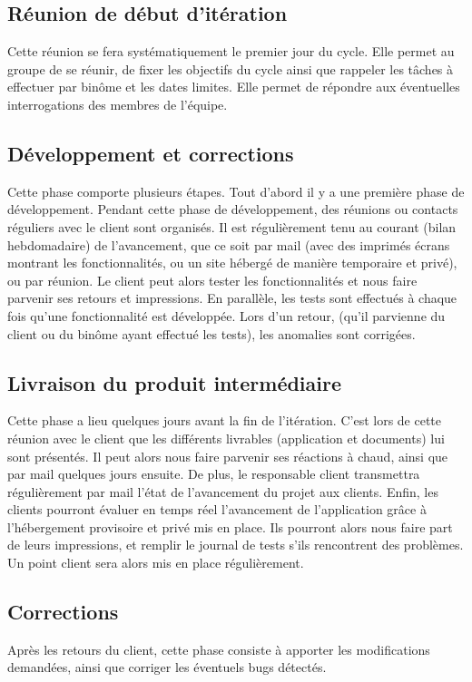 \documentclass{../res/univ-projet}
\begin{document}
  \subsection{Réunion de début d'itération}    
    Cette réunion se fera systématiquement le premier jour du cycle. Elle permet au groupe de se réunir, de fixer les objectifs du cycle ainsi que rappeler les tâches à effectuer par binôme et les dates limites. Elle permet de répondre aux éventuelles interrogations des membres de l’équipe.

  \subsection{Développement et corrections}
    Cette phase comporte plusieurs étapes. Tout d’abord il y a une première phase de développement. Pendant cette phase de développement, des réunions ou contacts réguliers avec le client sont organisés. Il est régulièrement tenu au courant (bilan hebdomadaire) de l’avancement, que ce soit par mail (avec des imprimés écrans montrant les fonctionnalités, ou un site hébergé de manière temporaire et privé), ou par réunion. Le client peut alors tester les fonctionnalités et nous faire parvenir ses retours et impressions. En parallèle, les tests sont effectués à chaque fois qu’une fonctionnalité est développée. Lors d’un retour, (qu’il parvienne du client ou du binôme ayant effectué les tests), les anomalies sont corrigées.
  \subsection{Livraison du produit intermédiaire}
    Cette phase a lieu quelques jours avant la fin de l’itération. C’est lors de cette réunion avec le client que les différents livrables (application et documents) lui sont présentés. Il peut alors nous faire parvenir ses réactions à chaud, ainsi que par mail quelques jours ensuite. De plus, le responsable client transmettra régulièrement par mail l’état de l’avancement du projet aux clients. Enfin, les clients pourront évaluer en temps réel l’avancement de l’application grâce à l’hébergement provisoire et privé mis en place. Ils pourront alors nous faire part de leurs impressions, et remplir le journal de tests s’ils rencontrent des problèmes. Un point client sera alors mis en place régulièrement.
  \subsection{Corrections}
    Après les retours du client, cette phase consiste à apporter les modifications demandées, ainsi que corriger les éventuels bugs détectés.
\end{document}
